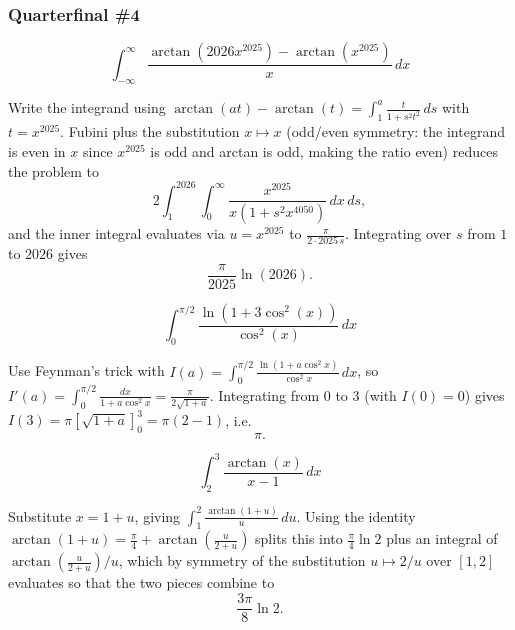 \subsubsection*{Quarterfinal \#4}
\begin{questions}

\question
\[
\int_{-\infty}^{\infty} \frac{\arctan(2026x^{2025})-\arctan(x^{2025})}{x} \, dx
\]
\begin{solution}
Write the integrand using $\arctan(a t)-\arctan(t)=\int_1^a \frac{t}{1+s^2t^2}\,ds$ with $t=x^{2025}$. Fubini plus the substitution $x\mapsto x$ (odd/even symmetry: the integrand is even in $x$ since $x^{2025}$ is odd and arctan is odd, making the ratio even) reduces the problem to
\[
2\int_1^{2026}\int_0^\infty \frac{x^{2025}}{x(1+s^2x^{4050})}\,dx\,ds,
\]
and the inner integral evaluates via $u=x^{2025}$ to $\frac{\pi}{2\cdot2025\,s}$. Integrating over $s$ from $1$ to $2026$ gives
\[
\frac{\pi}{2025}\ln(2026).
\]
\end{solution}

\question
\[
\int_0^{\pi/2} \frac{\ln\left(1+3\cos^2(x)\right)}{\cos^2(x)} \, dx
\]
\begin{solution}
Use Feynman's trick with $I(a)=\int_0^{\pi/2}\frac{\ln(1+a\cos^2x)}{\cos^2x}\,dx$, so
$I'(a)=\int_0^{\pi/2}\frac{dx}{1+a\cos^2x}=\frac{\pi}{2\sqrt{1+a}}$. Integrating from $0$ to $3$ (with $I(0)=0$) gives $I(3)=\pi\left[\sqrt{1+a}\right]_0^3=\pi(2-1)$, i.e.
\[
\pi.
\]
\end{solution}

\question
\[
\int_2^3 \frac{\arctan(x)}{x-1} \, dx
\]
\begin{solution}
Substitute $x=1+u$, giving $\int_1^2 \frac{\arctan(1+u)}{u}\,du$. Using the identity $\arctan(1+u)=\frac{\pi}{4}+\arctan\!\left(\frac{u}{2+u}\right)$ splits this into $\frac{\pi}{4}\ln 2$ plus an integral of $\arctan\!\left(\frac{u}{2+u}\right)/u$, which by symmetry of the substitution $u\mapsto 2/u$ over $[1,2]$ evaluates so that the two pieces combine to
\[
\frac{3\pi}{8}\ln 2.
\]
\end{solution}

\end{questions}

